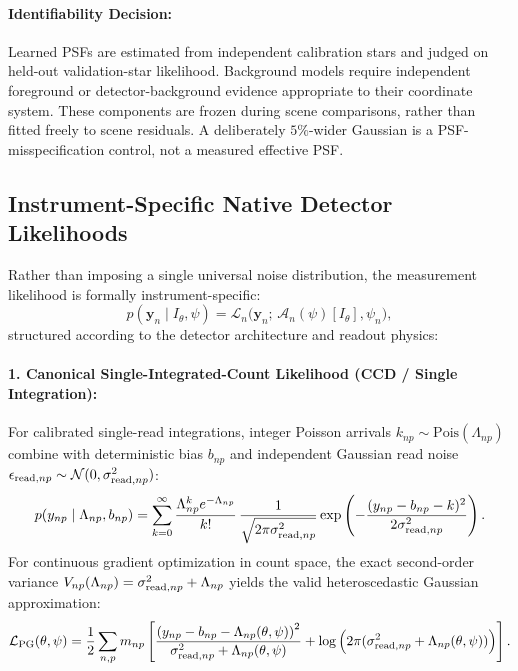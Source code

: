 \documentclass[11pt,a4paper]{article}
\begin{document}
\paragraph{Identifiability Decision:}
Learned PSFs are estimated from independent calibration stars and judged on held-out validation-star likelihood. Background models require independent foreground or detector-background evidence appropriate to their coordinate system. These components are frozen during scene comparisons, rather than fitted freely to scene residuals. A deliberately $5\%$-wider Gaussian is a PSF-misspecification control, not a measured effective PSF.

\subsection{Instrument-Specific Native Detector Likelihoods}
\label{subsec:likelihoods}

Rather than imposing a single universal noise distribution, the measurement likelihood is formally instrument-specific:
\begin{equation}
p(\boldsymbol{y}_n \mid I_\theta, \psi) = \mathcal{L}_n\Big( \boldsymbol{y}_n ;\, \mathcal{A}_n(\psi)[I_\theta], \psi_n \Big),
\end{equation}
structured according to the detector architecture and readout physics:

\paragraph{1. Canonical Single-Integrated-Count Likelihood (CCD / Single Integration):}
For calibrated single-read integrations, integer Poisson arrivals $k_{np} \sim \mathrm{Pois}(\Lambda_{np})$ combine with deterministic bias $b_{np}$ and independent Gaussian read noise $\epsilon_{{\rm read}, np} \sim \mathcal{N}(0, \sigma_{{\rm read}, np}^2)$:
\begin{equation}
p(y_{np} \mid \Lambda_{np}, b_{np}) = \sum_{k=0}^{\infty} \frac{\Lambda_{np}^k e^{-\Lambda_{np}}}{k!} \, \frac{1}{\sqrt{2\pi \sigma_{{\rm read}, np}^2}} \exp\left( -\frac{(y_{np} - b_{np} - k)^2}{2\sigma_{{\rm read}, np}^2} \right).
\end{equation}
For continuous gradient optimization in count space, the exact second-order variance $V_{np}(\Lambda_{np}) = \sigma_{{\rm read}, np}^2 + \Lambda_{np}$ yields the valid heteroscedastic Gaussian approximation:
\begin{equation}
\mathcal{L}_{\rm PG}(\theta, \psi) = \frac{1}{2} \sum_{n, p} m_{np} \left[ \frac{\left( y_{np} - b_{np} - \Lambda_{np}(\theta, \psi) \right)^2}{\sigma_{{\rm read}, np}^2 + \Lambda_{np}(\theta, \psi)} + \log\Big( 2\pi (\sigma_{{\rm read}, np}^2 + \Lambda_{np}(\theta, \psi)) \Big) \right].
\end{equation}
\end{document}
